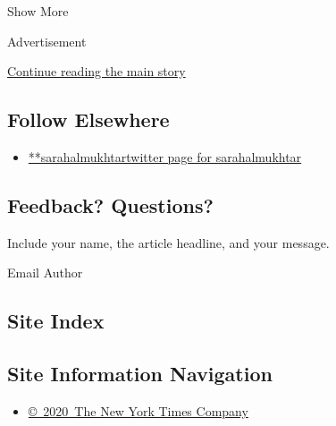 Show More

Advertisement

\protect\hyperlink{after-mid2}{Continue reading the main story}

\hypertarget{follow-elsewhere}{%
\subsection{Follow Elsewhere}\label{follow-elsewhere}}

\begin{itemize}
\tightlist
\item
  \href{https://twitter.com/sarahalmukhtar}{**sarahalmukhtartwitter page
  for sarahalmukhtar}
\end{itemize}

\hypertarget{feedback-questions}{%
\subsection{Feedback? Questions?}\label{feedback-questions}}

Include your name, the article headline, and your message.

Email Author

\hypertarget{site-index}{%
\subsection{Site Index}\label{site-index}}

\hypertarget{site-information-navigation}{%
\subsection{Site Information
Navigation}\label{site-information-navigation}}

\begin{itemize}
\tightlist
\item
  \href{https://help.nytimes.com/hc/en-us/articles/115014792127-Copyright-notice}{©~2020~The
  New York Times Company}
\end{itemize}


